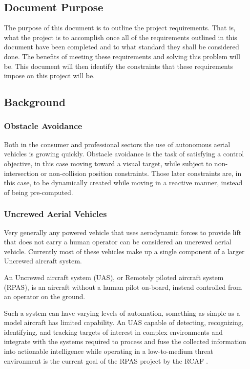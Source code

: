\documentclass{article}
\begin{document}
	\subsection{Document Purpose}
	
	The purpose of this document is to outline the project requirements. That is, what the project is to accomplish once all of the requirements outlined in this document have been completed and to what standard they shall be considered done. The benefits of meeting these requirements and solving this problem will be. This document will then identify the constraints that these requirements impose on this project will be.
	
	\subsection{Background}
	
		\subsubsection{Obstacle Avoidance}
		
		Both in the consumer and professional sectors the use of autonomous aerial vehicles is growing quickly. 
		Obstacle avoidance is the task of satisfying a control objective, in this case moving toward a visual target, while subject to non-intersection or non-collision position constraints. Those later constraints are, in this case, to be dynamically created while moving in a reactive manner, instead of being pre-computed.
		
		\subsubsection{Uncrewed Aerial Vehicles}
		
		Very generally any powered vehicle that uses aerodynamic forces to provide lift that does not carry a human operator can be considered an uncrewed aerial vehicle. Currently most of these vehicles make up a single component of a larger Uncrewed aircraft system. 
		
		An Uncrewed aircraft system (UAS), or Remotely piloted aircraft system (RPAS), is an aircraft without a human pilot on-board, instead controlled from an operator on the ground. 
		
		Such a system can have varying levels of automation, something as simple as a model aircraft has limited capability. An UAS capable of detecting, recognizing, identifying, and tracking targets of interest in complex environments and integrate with the systems required to process and fuse the collected information into actionable intelligence while operating in a low-to-medium threat environment is the current goal of the RPAS project by the RCAF \cite{RPAS}. 
		
\end{document}
